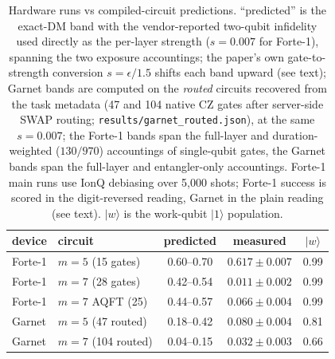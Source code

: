 \documentclass[aps,pra,reprint,superscriptaddress,nofootinbib,floatfix]{revtex4-2}
\begin{document}
\begin{table}[t]
\caption{Hardware runs vs compiled-circuit predictions. ``predicted''
is the exact-DM band with the vendor-reported two-qubit infidelity
used directly as the per-layer strength ($s=0.007$ for Forte-1),
spanning the two exposure accountings; the paper's own
gate-to-strength conversion $s=\epsilon/1.5$ shifts each band upward
(see text);
Garnet bands are computed on the \emph{routed} circuits recovered
from the task metadata (47 and 104 native CZ gates after server-side
SWAP routing; \texttt{results/garnet\_routed.json}), at the same
$s=0.007$; the Forte-1 bands span the full-layer and
duration-weighted ($130/970$) accountings of single-qubit gates,
the Garnet bands span the full-layer and entangler-only accountings.
Forte-1 main runs use
IonQ debiasing over 5{,}000 shots; Forte-1 success is scored in the
digit-reversed reading, Garnet in the plain reading (see text). $\lvert w\rangle$ is the work-qubit
$\lvert1\rangle$ population.}
\label{tab:hardware}
\begin{ruledtabular}
\begin{tabular}{llccc}
device & circuit & predicted & measured & $\lvert w\rangle$ \\
\hline
Forte-1 & $m{=}5$ (15 gates)      & 0.60--0.70 & $0.617\pm0.007$ & 0.99 \\
Forte-1 & $m{=}7$ (28 gates)      & 0.42--0.54 & $0.011\pm0.002$ & 0.99 \\
Forte-1 & $m{=}7$ AQFT (25)       & 0.44--0.57 & $0.066\pm0.004$ & 0.99 \\
Garnet  & $m{=}5$ (47 routed)     & 0.18--0.42 & $0.080\pm0.004$ & 0.81 \\
Garnet  & $m{=}7$ (104 routed)    & 0.04--0.15 & $0.032\pm0.003$ & 0.66 \\
\end{tabular}
\end{ruledtabular}
\end{table}
\end{document}
